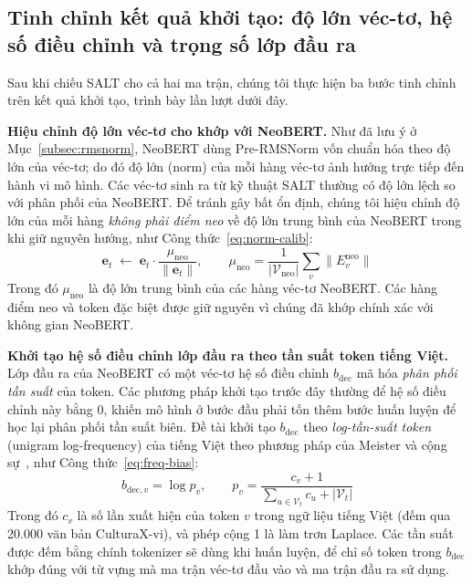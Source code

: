 \subsection{Tinh chỉnh kết quả khởi tạo: độ lớn véc-tơ, hệ số điều chỉnh và trọng số lớp đầu ra}
\label{subsec:post-proj}

Sau khi chiếu SALT cho cả hai ma trận, chúng tôi thực hiện ba bước tinh chỉnh trên kết quả
khởi tạo, trình bày lần lượt dưới đây.

\textbf{Hiệu chỉnh độ lớn véc-tơ cho khớp với NeoBERT.}\label{subsec:norm-calib}
Như đã lưu ý ở Mục~\ref{subsec:rmsnorm}, NeoBERT dùng Pre-RMSNorm vốn chuẩn hóa theo độ lớn
của véc-tơ; do đó độ lớn (norm) của mỗi hàng véc-tơ ảnh hưởng trực tiếp đến hành vi mô hình.
Các véc-tơ sinh ra từ kỹ thuật SALT thường có độ lớn lệch so với phân phối của NeoBERT. Để
tránh gây bất ổn định, chúng tôi hiệu chỉnh độ lớn của mỗi hàng \textit{không phải điểm neo} về
độ lớn trung bình của NeoBERT trong khi giữ nguyên hướng, như Công thức~\eqref{eq:norm-calib}:
\begin{equation}
  \label{eq:norm-calib}
  \mathbf{e}_t \;\leftarrow\; \mathbf{e}_t \cdot \frac{\mu_{\mathrm{neo}}}{\lVert \mathbf{e}_t\rVert},
  \qquad
  \mu_{\mathrm{neo}} = \frac{1}{|\mathcal{V}_{\mathrm{neo}}|}\sum_{v} \lVert E^{\mathrm{neo}}_v\rVert
\end{equation}
Trong đó $\mu_{\mathrm{neo}}$ là độ lớn trung bình của các hàng véc-tơ NeoBERT. Các hàng điểm neo
và token đặc biệt được giữ nguyên vì chúng đã khớp chính xác với không gian NeoBERT.

\textbf{Khởi tạo hệ số điều chỉnh lớp đầu ra theo tần suất token tiếng Việt.}\label{subsec:freq-bias}
Lớp đầu ra của NeoBERT có một véc-tơ hệ số điều chỉnh $b_{\mathrm{dec}}$ mã hóa \textit{phân phối tần suất} của token. Các phương pháp khởi tạo trước đây thường để hệ số điều chỉnh này bằng 0, khiến
mô hình ở bước đầu phải tốn thêm bước huấn luyện để học lại phân phối tần suất biên. Đề tài khởi tạo
$b_{\mathrm{dec}}$ theo \textit{log-tần-suất token} (unigram log-frequency) của tiếng Việt
theo phương pháp của Meister và cộng sự~\cite{meister2022naturalbias}, như
Công thức~\eqref{eq:freq-bias}:
\begin{equation}
  \label{eq:freq-bias}
  b_{\mathrm{dec},v} = \log p_v, \qquad
  p_v = \frac{c_v + 1}{\sum_{u\in\mathcal{V}_t} c_u + |\mathcal{V}_t|}
\end{equation}
Trong đó $c_v$ là số lần xuất hiện của token $v$ trong ngữ liệu tiếng Việt (đếm qua 20.000
văn bản CulturaX-vi), và phép cộng 1 là làm trơn Laplace. Các tần suất được đếm bằng chính
tokenizer sẽ dùng khi huấn luyện, để chỉ số token trong $b_{\mathrm{dec}}$ khớp đúng với từ vựng
mà ma trận véc-tơ đầu vào và ma trận đầu ra sử dụng.

